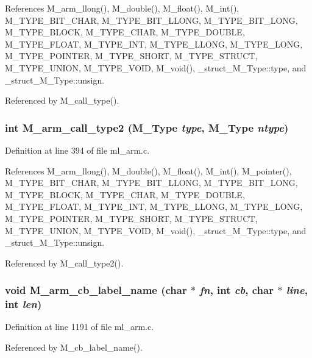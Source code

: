 References M\_\-arm\_\-llong(), M\_\-double(), M\_\-float(), M\_\-int(), M\_\-TYPE\_\-BIT\_\-CHAR, M\_\-TYPE\_\-BIT\_\-LLONG, M\_\-TYPE\_\-BIT\_\-LONG, M\_\-TYPE\_\-BLOCK, M\_\-TYPE\_\-CHAR, M\_\-TYPE\_\-DOUBLE, M\_\-TYPE\_\-FLOAT, M\_\-TYPE\_\-INT, M\_\-TYPE\_\-LLONG, M\_\-TYPE\_\-LONG, M\_\-TYPE\_\-POINTER, M\_\-TYPE\_\-SHORT, M\_\-TYPE\_\-STRUCT, M\_\-TYPE\_\-UNION, M\_\-TYPE\_\-VOID, M\_\-void(), \_\-struct\_\-M\_\-Type::type, and \_\-struct\_\-M\_\-Type::unsign.

Referenced by M\_\-call\_\-type().
\subsubsection{\setlength{\rightskip}{0pt plus 5cm}int M\_\-arm\_\-call\_\-type2 (\bf{M\_\-Type} {\em type}, \bf{M\_\-Type} {\em ntype})}\label{ml__arm_8c_76009f8346aed501aff6fce15d6e1b67}




Definition at line 394 of file ml\_\-arm.c.

References M\_\-arm\_\-llong(), M\_\-double(), M\_\-float(), M\_\-int(), M\_\-pointer(), M\_\-TYPE\_\-BIT\_\-CHAR, M\_\-TYPE\_\-BIT\_\-LLONG, M\_\-TYPE\_\-BIT\_\-LONG, M\_\-TYPE\_\-BLOCK, M\_\-TYPE\_\-CHAR, M\_\-TYPE\_\-DOUBLE, M\_\-TYPE\_\-FLOAT, M\_\-TYPE\_\-INT, M\_\-TYPE\_\-LLONG, M\_\-TYPE\_\-LONG, M\_\-TYPE\_\-POINTER, M\_\-TYPE\_\-SHORT, M\_\-TYPE\_\-STRUCT, M\_\-TYPE\_\-UNION, M\_\-TYPE\_\-VOID, M\_\-void(), \_\-struct\_\-M\_\-Type::type, and \_\-struct\_\-M\_\-Type::unsign.

Referenced by M\_\-call\_\-type2().
\subsubsection{\setlength{\rightskip}{0pt plus 5cm}void M\_\-arm\_\-cb\_\-label\_\-name (char $\ast$ {\em fn}, int {\em cb}, char $\ast$ {\em line}, int {\em len})}\label{ml__arm_8c_0d6995ab2feb69e01e4ad53c3f798997}




Definition at line 1191 of file ml\_\-arm.c.

Referenced by M\_\-cb\_\-label\_\-name().
